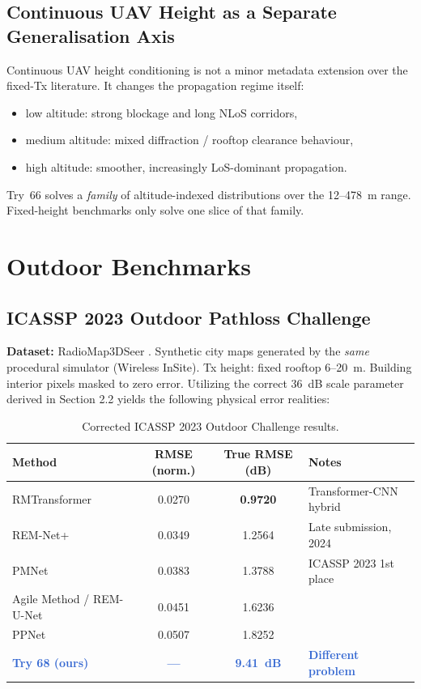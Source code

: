 \documentclass[11pt,a4paper]{article}
\newcommand{\better}[1]{\textcolor{good}{\textbf{#1}}}
\newcommand{\ours}[1]{\textcolor{highlight}{\textbf{#1}}}
\begin{document}
\subsection{Continuous UAV Height as a Separate Generalisation Axis}

Continuous UAV height conditioning is not a minor metadata extension over the
fixed-Tx literature. It changes the propagation regime itself:
\begin{itemize}[nosep]
    \item low altitude: strong blockage and long NLoS corridors,
    \item medium altitude: mixed diffraction / rooftop clearance behaviour,
    \item high altitude: smoother, increasingly LoS-dominant propagation.
\end{itemize}
Try~66 solves a \emph{family} of altitude-indexed distributions over the 12--478~m range.
Fixed-height benchmarks only solve one slice of that family.

\section{Outdoor Benchmarks}
\label{sec:outdoor}

\subsection{ICASSP 2023 Outdoor Pathloss Challenge}
\label{ssec:icassp2023}

\textbf{Dataset:} RadioMap3DSeer \cite{icassp2023challenge}. Synthetic city maps generated by the \emph{same} procedural simulator (Wireless InSite). Tx height: fixed rooftop 6--20~m. Building interior pixels masked to zero error. Utilizing the correct 36~dB scale parameter derived in Section 2.2 yields the following physical error realities:

\begin{table}[h!]
\centering
\caption{Corrected ICASSP 2023 Outdoor Challenge results.}
\label{tab:icassp2023}
\small
\begin{tabular}{lccl}
\toprule
\textbf{Method} & \textbf{RMSE (norm.)} & \textbf{True RMSE (dB)} & \textbf{Notes} \\
\midrule
RMTransformer \cite{rmtransformer2025} & 0.0270 & \better{0.9720} & Transformer-CNN hybrid \\
REM-Net+ \cite{remnet2024} & 0.0349 & 1.2564 & Late submission, 2024 \\
PMNet \cite{pmnet2023} & 0.0383 & 1.3788 & ICASSP 2023 1st place \\
Agile Method / REM-U-Net & 0.0451 & 1.6236 & \\
PPNet & 0.0507 & 1.8252 & \\
\midrule
\ours{Try 68 (ours)} & \ours{---} & \ours{9.41~dB} & \ours{Different problem} \\
\bottomrule
\end{tabular}
\end{table}
\normalsize
\end{document}
